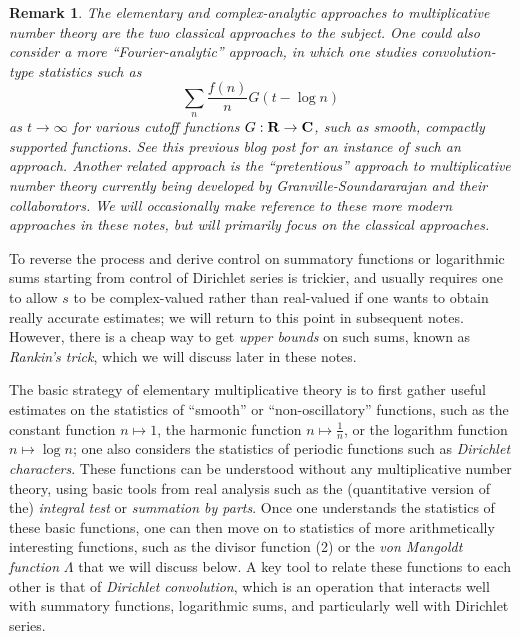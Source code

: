 \documentclass[10pt,reqno]{amsart}
\newtheorem{remark}[theorem]{Remark}
\begin{document}
\begin{remark}
    The elementary and complex-analytic approaches to multiplicative number theory are the two classical approaches to the subject. One could also consider a more “Fourier-analytic” approach, in which one studies convolution-type statistics such as
    \begin{equation} \sum_n \frac{f(n)}{n} G( t - \log n ) \end{equation}
    as $t \rightarrow \infty$ for various cutoff functions $G: {\bf R} \rightarrow {\bf C}$, such as smooth, compactly supported functions. See \emph{this previous blog post} for an instance of such an approach. Another related approach is the “pretentious” approach to multiplicative number theory currently being developed by Granville-Soundararajan and their collaborators. We will occasionally make reference to these more modern approaches in these notes, but will primarily focus on the classical approaches.
\end{remark}

To reverse the process and derive control on summatory functions or logarithmic sums starting from control of Dirichlet series is trickier, and usually requires one to allow $s$ to be complex-valued rather than real-valued if one wants to obtain really accurate estimates; we will return to this point in subsequent notes. However, there is a cheap way to get \emph{upper bounds} on such sums, known as \emph{Rankin’s trick}, which we will discuss later in these notes.

The basic strategy of elementary multiplicative theory is to first gather useful estimates on the statistics of “smooth” or “non-oscillatory” functions, such as the constant function $n \mapsto 1$, the harmonic function $n \mapsto \frac{1}{n}$, or the logarithm function $n \mapsto \log n$; one also considers the statistics of periodic functions such as \emph{Dirichlet characters}. These functions can be understood without any multiplicative number theory, using basic tools from real analysis such as the (quantitative version of the) \emph{integral test} or \emph{summation by parts}. Once one understands the statistics of these basic functions, one can then move on to statistics of more arithmetically interesting functions, such as the divisor function (2) or the \emph{von Mangoldt function} $\Lambda$ that we will discuss below. A key tool to relate these functions to each other is that of \emph{Dirichlet convolution}, which is an operation that interacts well with summatory functions, logarithmic sums, and particularly well with Dirichlet series.
\end{document}
